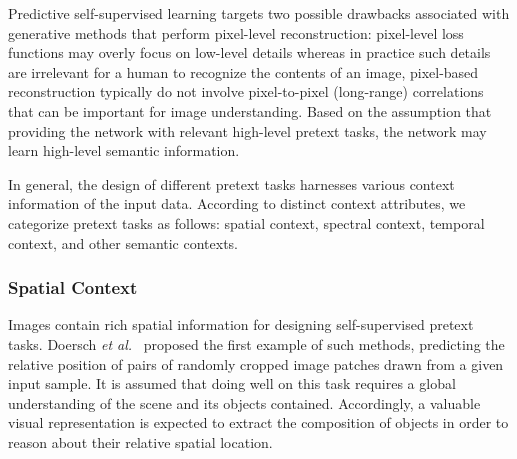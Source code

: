 \documentclass[lettersize,journal]{IEEEtran}
\newcommand{\etal}{\textit{et al.}}
\begin{document}
Predictive self-supervised learning targets two possible drawbacks associated with generative methods that perform pixel-level reconstruction:  pixel-level loss functions may overly focus on low-level details whereas in practice such details are irrelevant for a human to recognize the contents of an image,  pixel-based reconstruction typically do not involve pixel-to-pixel (long-range) correlations that can be important for image understanding. Based on the assumption that providing the network with relevant high-level pretext tasks, the network may learn high-level semantic information. 

In general, the design of different pretext tasks harnesses various context information of the input data. According to distinct context attributes, we categorize pretext tasks as follows: spatial context, spectral context, temporal context, and other semantic contexts.



\subsubsection{Spatial Context}

Images contain rich spatial information for designing self-supervised pretext tasks. Doersch \etal~\cite{doersch2015unsupervised} proposed the first example of such methods, predicting the relative position of pairs of randomly cropped image patches drawn from a given input sample. It is assumed that doing well on this task requires a global understanding of the scene and its objects contained. Accordingly, a valuable visual representation is expected to extract the composition of objects in order to reason about their relative spatial location. 
\end{document}
